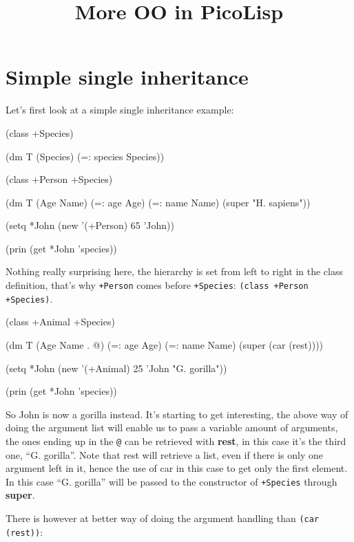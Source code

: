 \title{More OO in PicoLisp}

\maketitle

\section{Simple single inheritance}
\label{sec:more-oo}

Let's first look at a simple single inheritance example:

\begin{wideverbatim}
(class +Species)

(dm T (Species)
    (=: species Species))

(class +Person +Species)

(dm T (Age Name)
    (=: age Age)
    (=: name Name)
    (super "H. sapiens"))

(setq *John (new '(+Person) 65 'John))

(prin (get *John 'species))
\end{wideverbatim}

Nothing really surprising here, the hierarchy is set from left to
right in the class definition, that's why \texttt{+Person} comes
before \texttt{+Species}: \texttt{(class +Person +Species)}.

\begin{wideverbatim}
(class +Animal +Species)

(dm T (Age Name . @)
    (=: age Age)
    (=: name Name)
    (super (car (rest))))

(setq *John (new '(+Animal) 25 'John "G. gorilla"))

(prin (get *John 'species))
\end{wideverbatim}

So John is now a gorilla instead. It's starting to get interesting,
the above way of doing the argument list will enable us to pass a
variable amount of arguments, the ones ending up in the \texttt{@} can
be retrieved with \textbf{rest}, in this case it's the third one, ``G.
gorilla''. Note that rest will retrieve a list, even if there is only
one argument left in it, hence the use of car in this case to get only
the first element. In this case ``G. gorilla'' will be passed to the
constructor of \texttt{+Species} through \textbf{super}.

There is however at better way of doing the argument handling than
\texttt{(car (rest))}:

